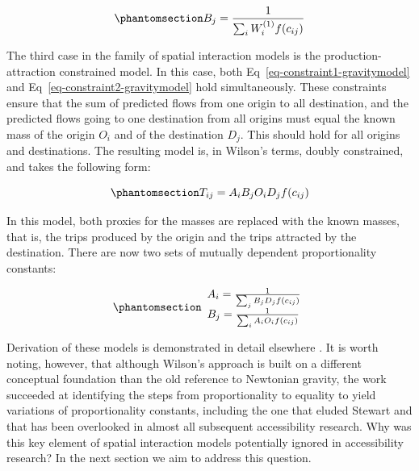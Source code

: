 \documentclass[
  10pt,
  letterpaper,
]{article}
\begin{document}
\begin{equation}\phantomsection\label{eq-attraction-constrained-balancing-factor}{
B_j = \frac{1}{\sum_i W_i^{(1)} f(c_{ij})}
}\end{equation}

The third case in the family of spatial interaction models is the
production-attraction constrained model. In this case, both
Eq~\ref{eq-constraint1-gravitymodel} and
Eq~\ref{eq-constraint2-gravitymodel} hold simultaneously. These
constraints ensure that the sum of predicted flows from one origin to
all destination, and the predicted flows going to one destination from
all origins must equal the known mass of the origin \(O_i\) and of the
destination \(D_j\). This should hold for all origins and destinations.
The resulting model is, in Wilson's terms, doubly constrained, and takes
the following form:

\begin{equation}\phantomsection\label{eq-doubly-constrained-gravitymodel}{
T_{ij} = A_i B_j O_i D_j f(c_{ij})
}\end{equation}

In this model, both proxies for the masses are replaced with the known
masses, that is, the trips produced by the origin and the trips
attracted by the destination. There are now two sets of mutually
dependent proportionality constants:

\begin{equation}\phantomsection\label{eq-doubly-constrained-balancing-factors}{
\begin{array}{l}
A_i = \frac{1}{\sum_j B_j D_j f(c_{ij})}\\
B_j = \frac{1}{\sum_i A_i O_i f(c_{ij})}
\end{array}
}\end{equation}

Derivation of these models is demonstrated in detail elsewhere
\citep[e.g.,][]{ortuzar_2011_modelling, wilsonSTATISTICALTHEORYSPATIAL1967}.
It is worth noting, however, that although Wilson's approach is built on
a different conceptual foundation than the old reference to Newtonian
gravity, the work succeeded at identifying the steps from
proportionality to equality to yield variations of proportionality
constants, including the one that eluded Stewart
\citep{stewartDemographicGravitationEvidence1948} and that has been
overlooked in almost all subsequent accessibility research. Why was this
key element of spatial interaction models potentially ignored in
accessibility research? In the next section we aim to address this
question.
\end{document}
